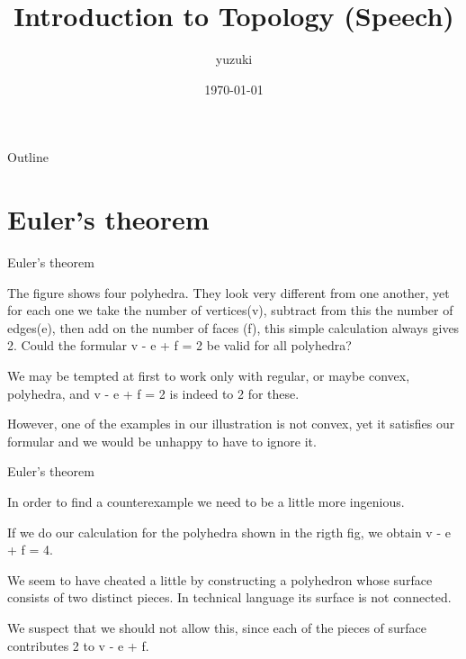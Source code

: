 \documentclass{beamer}
\title{Introduction to Topology (Speech)}
\author{yuzuki}
\institute{Eyes, Japan}
\date{\today}
\begin{document}
\begin{frame}
  \titlepage
\end{frame}

\begin{frame}{Outline}
  \tableofcontents
\end{frame}


\section{Euler's theorem}

\begin{frame}{Euler's theorem}
  \begin{block}{}
    The figure shows four polyhedra. They look very different from one another, yet for each one we take the number of vertices(v), subtract from this the number of edges(e), then add on the number of faces (f), this simple calculation always gives 2. Could the formular v - e + f = 2 be valid for all polyhedra?
  \end{block}
  \begin{block}{}
    We may be tempted at first to work only with regular, or maybe convex, polyhedra, and v - e + f = 2 is indeed to 2 for these.
  \end{block}
  \begin{block}{}
    However, one of the examples in our illustration is not convex, yet it satisfies our formular and we would be unhappy to have to ignore it.
  \end{block}
\end{frame}

\begin{frame}{Euler's theorem}
  \begin{block}{}
    In order to find a counterexample we need to be a little more ingenious.
  \end{block}
  \begin{block}{}
    If we do our calculation for the polyhedra shown in the rigth fig, we obtain v - e + f = 4.
  \end{block}
  \begin{block}{}
    We seem to have cheated a little by constructing a polyhedron whose surface consists of two distinct pieces. In technical language its surface is not connected.
  \end{block}
  \begin{block}{}
    We suspect that we should not allow this, since each of the pieces of surface contributes 2 to v - e + f.
  \end{block}
\end{frame}
\end{document}
